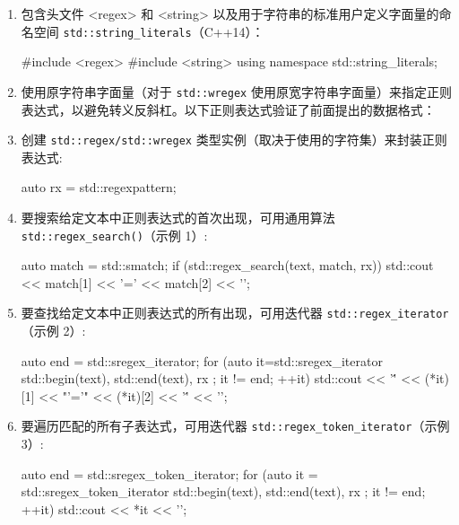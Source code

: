 \begin{enumerate}
\item
包含头文件 <regex> 和 <string> 以及用于字符串的标准用户定义字面量的命名空间 \verb|std::string_literals|（C++14）：

\begin{cpp}
#include <regex>
#include <string>
using namespace std::string_literals;
\end{cpp}

\item
使用原字符串字面量（对于 \verb|std::wregex| 使用原宽字符串字面量）来指定正则表达式，以避免转义反斜杠。以下正则表达式验证了前面提出的数据格式：


\item
创建 \verb|std::regex/std::wregex| 类型实例（取决于使用的字符集）来封装正则表达式:

\begin{cpp}
auto rx = std::regex{pattern};
\end{cpp}

\item
要搜索给定文本中正则表达式的首次出现，可用通用算法 \verb|std::regex_search()|（示例 1）:

\begin{cpp}
auto match = std::smatch{};
if (std::regex_search(text, match, rx))
{
    std::cout << match[1] << '=' << match[2] << '\n';
}
\end{cpp}

\item
要查找给定文本中正则表达式的所有出现，可用迭代器 \verb|std::regex_iterator|（示例 2）:

\begin{cpp}
auto end = std::sregex_iterator{};
for (auto it=std::sregex_iterator{ std::begin(text),
                                   std::end(text), rx };
    it != end; ++it)
{
    std::cout << '\'' << (*it)[1] << "'='"
    << (*it)[2] << '\'' << '\n';
}
\end{cpp}

\item
要遍历匹配的所有子表达式，可用迭代器 \verb|std::regex_token_iterator|（示例 3）:

\begin{cpp}
auto end = std::sregex_token_iterator{};
for (auto it = std::sregex_token_iterator{
                 std::begin(text), std::end(text), rx };
    it != end; ++it)
{
    std::cout << *it << '\n';
}
\end{cpp}
\end{enumerate}

